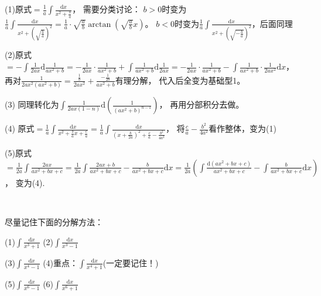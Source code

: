 \begin{solution}
  (1)原式$= \frac{1}{a} \int \frac{\mathrm{d}x}{x^2 + \frac{b}{a}}$，
  需要分类讨论：
  $b > 0$时变为$\frac{1}{a} \int \frac{\mathrm{d}x}{x^2 + (\sqrt{\frac{b}{a}})^2} = \frac{1}{a} \cdot \sqrt{\frac{a}{b}} \arctan (\sqrt{\frac{a}{b}}x)$。
  $b < 0$时变为$\frac{1}{a} \int \frac{\mathrm{d}x}{x^2 + (\sqrt{ - \frac{b}{a}})^2}$，后面同理

  (2)原式$= - \int \frac{1}{2ax} \mathrm{d} \frac{1}{ax^2 + b}
  = - \frac{1}{2ax} \cdot \frac{1}{ax^2 + b} + \int \frac{1}{ax^2 + b} \mathrm{d} \frac{1}{2ax}
  = - \frac{1}{2ax} \cdot \frac{1}{ax^2 + b} - \int \frac{1}{ax^2 + b} \cdot \frac{1}{2ax^2}\mathrm{d}x$，
  再对$\frac{1}{2ax^2 (ax^2 + b)} = \frac{\frac{1}{b}}{2ax^2} + \frac{- \frac{1}{2b}}{ax^2 + b}$有理分解，
  代入后全变为基础型1。

  (3)
  同理转化为$\int \frac{1}{2ax(1 - n)} \mathrm{d}(\frac{1}{(ax^2 + b)^{n-1}})$，
  再用分部积分去做。

  (4)
  原式$= \frac{1}{a} \int \frac{\mathrm{d}x}{x^2 + \frac{b}{a} x + \frac{c}{a}} =
  \frac{1}{a} \int \frac{\mathrm{d}x}{(x + \frac{b}{2a})^2+ \frac{c}{a} - \frac{b^2}{4a^2}} $，
  将$\frac{c}{a} - \frac{b^2}{4a^2}$看作整体，变为(1)

  (5)原式$= \frac{1}{2a} \int \frac{2ax}{ax^2 + bx + c}
  = \frac{1}{2a} \int \frac{2ax + b}{ax^2 + bx + c} - \frac{b}{ax^2 + bx + c}\mathrm{d}x
  = \frac{1}{2a}(\int \frac{\mathrm{d}(ax^2 + bx + c)}{ax^2 + bx + c} - \int \frac{b}{ax^2 + bx + c}\mathrm{d}x)$，
  变为(4).

\end{solution}

~

\begin{exercise}[次方和差]
  尽量记住下面的分解方法：

  (1)$\int \frac{\mathrm{d} x}{x^3 + 1}$
  (2)$\int \frac{\mathrm{d} x}{x^3 - 1}$
  
  (3)$\int \frac{\mathrm{d} x}{x^4 - 1}$
  (4)重点：$\int \frac{\mathrm{d} x}{x^4 + 1}$(一定要记住！)

  (5)$\int \frac{\mathrm{d} x}{x^6 - 1}$
  (6)$\int \frac{\mathrm{d} x}{x^6 + 1}$
\end{exercise}

